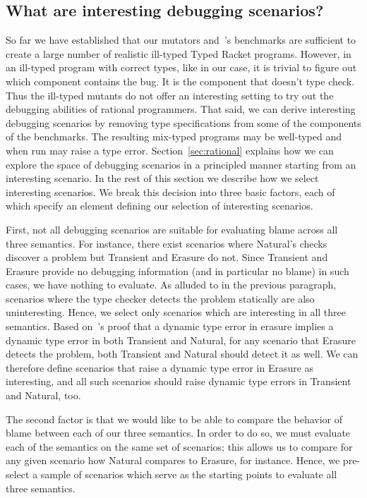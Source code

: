 \subsection{What are interesting debugging scenarios?}
So far we have established that our mutators and~\citet{gtnffvf-jfp-2019}'s
benchmarks are sufficient to create a large number of realistic ill-typed Typed Racket
programs. However, in an ill-typed program with correct types, like
in our case, it is trivial to figure out which component contains the bug.
It is the component that doesn't type check. Thus the ill-typed mutants
do not offer an interesting setting to try out the debugging abilities of
rational programmers. That said, we can derive interesting debugging
scenarios by removing type specifications from some of the components of
the benchmarks. The resulting mix-typed programs may be well-typed and when
run may raise a type error. Section~\ref{sec:rational} explains how we can
explore the space of debugging scenarios in a principled manner starting from
an interesting scenario.
In the rest of this section we describe how we select interesting scenarios.
We break this decision into three basic factors, each of which specify an element defining our selection of interesting scenarios.

First, not all debugging scenarios are suitable for evaluating blame across all three semantics.
For instance, there exist scenarios where Natural's checks discover a problem but Transient and Erasure do not.
Since Transient and Erasure provide no debugging information (and in particular no blame) in such cases, we have nothing to evaluate.
As alluded to in the previous paragraph, scenarios where the type checker detects the problem statically are also uninteresting.
Hence, we select only scenarios which are interesting in all three semantics.
Based on~\citet{gfd-oopsla-2019}'s proof that a dynamic type error in erasure implies a dynamic type error in both Transient and Natural, for any scenario that Erasure detects the problem, both Transient and Natural should detect it as well.
We can therefore define scenarios that raise a dynamic type error in Erasure as interesting, and all such scenarios should raise dynamic type errors in Transient and Natural, too.

The second factor is that we would like to be able to compare the behavior of blame between each of our three semantics.
In order to do so, we must evaluate each of the semantics on the same set of scenarios;
this allows us to compare for any given scenario how Natural compares to Erasure, for instance.
Hence, we pre-select a sample of scenarios which serve as the starting points to evaluate all three semantics.

